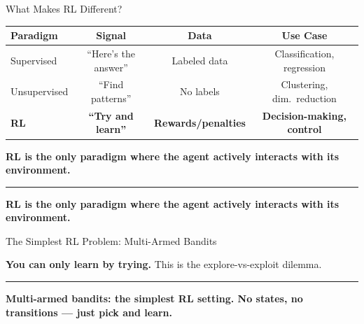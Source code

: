 \documentclass[8pt,aspectratio=169]{beamer}
\newcommand{\bottomnote}[1]{%
\vfill
\vspace{-2mm}
\textcolor{mllavender2}{\rule{\textwidth}{0.4pt}}
\vspace{1mm}
\footnotesize
\textbf{#1}
}
\newcommand{\highlight}[1]{\textcolor{mlorange}{\textbf{#1}}}
\begin{document}
\begin{frame}{What Makes RL Different?}
\centering
\small
\begin{tabular}{l c c c}
\toprule
\textbf{Paradigm} & \textbf{Signal} & \textbf{Data} & \textbf{Use Case} \\
\midrule
Supervised & ``Here's the answer'' & Labeled data & Classification, regression \\
Unsupervised & ``Find patterns'' & No labels & Clustering, dim.\ reduction \\
\textbf{RL} & \textbf{``Try and learn''} & \textbf{Rewards/penalties} & \textbf{Decision-making, control} \\
\bottomrule
\end{tabular}

\vspace{5mm}
\highlight{RL is the only paradigm where the agent actively interacts with its environment.}
\bottomnote{RL is the only paradigm where the agent actively interacts with its environment.}
\end{frame}

\begin{frame}{The Simplest RL Problem: Multi-Armed Bandits}
\centering
{}

\vspace{2mm}
\textbf{You can only learn by trying.} This is the explore-vs-exploit dilemma.
\bottomnote{Multi-armed bandits: the simplest RL setting. No states, no transitions --- just pick and learn.}
\end{frame}
\end{document}
